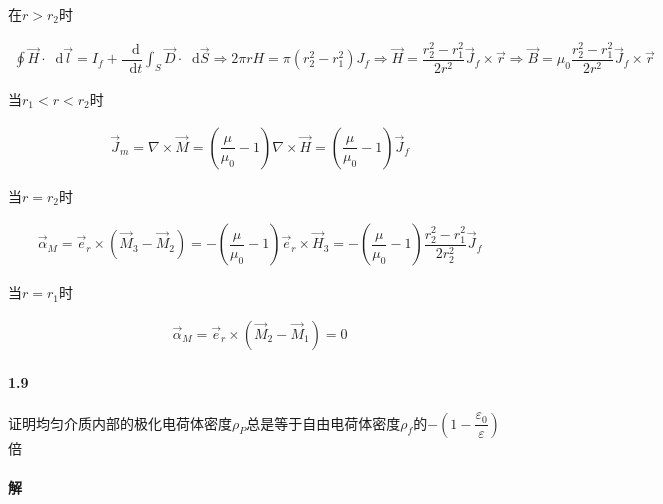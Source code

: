 \documentclass{article}
\newcommand*{\md}{\mathop{}\!\mathrm{d}}
\newcommand*{\Jmath}{J}
\begin{document}
在$r>r_2$时

\begin{equation*}
  \begin{aligned}
    \oint \vec{H} \cdot \md \vec{l} = I_f + \dfrac{\md}{\md t} \int_S \vec{D} \cdot \md \vec{S}
    \Rightarrow
    2\pi r H = \pi \left( r_2^2 - r_1^2 \right) J_f
    \Rightarrow
    \vec{H} = \dfrac{r_2^2 - r_1^2}{2 r^2 } \vec{\Jmath}_f \times \vec{r} 
    \Rightarrow
    \vec{B} = \mu_0 \dfrac{r_2^2 - r_1^2}{2 r^2 } \vec{\Jmath}_f \times \vec{r}
  \end{aligned}
\end{equation*}

当$r_1 < r < r_2$时

\begin{equation*}
  \begin{aligned}
    \vec{\Jmath}_m = \nabla \times \vec{M} = \left( \dfrac{\mu}{\mu_0} - 1  \right) \nabla \times \vec{H} = \left( \dfrac{\mu}{\mu_0} - 1  \right) \vec{\Jmath}_f
  \end{aligned}
\end{equation*}

当$r=r_2$时

\begin{equation*}
  \begin{aligned}
    \vec{\alpha}_M = \vec{e}_r \times \left( \vec{M}_3 - \vec{M}_2 \right) = - \left( \dfrac{\mu}{\mu_0} - 1  \right) \vec{e}_r \times \vec{H}_3 = - \left( \dfrac{\mu}{\mu_0} - 1  \right) \dfrac{r_2^2 - r_1^2}{ 2 r_2^2} \vec{\Jmath}_f 
  \end{aligned}
\end{equation*}

当$r=r_1$时

\begin{equation*}
  \begin{aligned}
    \vec{\alpha}_M = \vec{e}_r \times \left( \vec{M}_2 - \vec{M}_1 \right) = 0
  \end{aligned}
\end{equation*}


\paragraph{1.9}

证明均匀介质内部的极化电荷体密度$\rho_P$总是等于自由电荷体密度$\rho_f$的$- \left( 1 - \dfrac{\varepsilon_0}{\varepsilon}  \right)$倍

\paragraph{解}
\end{document}

